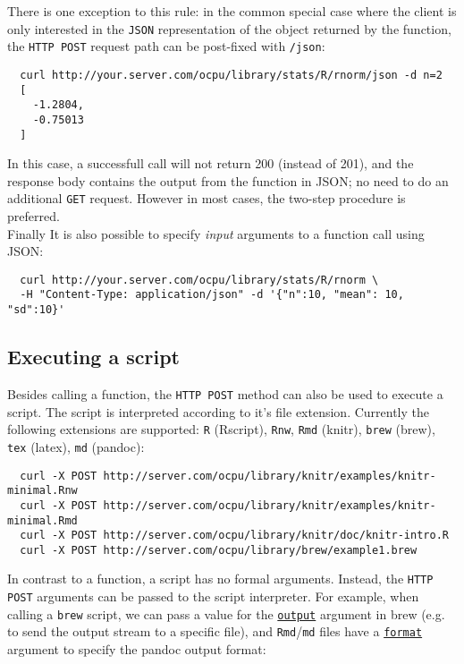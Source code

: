 \documentclass{scrartcl}\usepackage[]{graphicx}\usepackage[]{color}
\begin{document}
\noindent There is one exception to this rule: in the common special case where the client is only interested in the \texttt{JSON} representation of the object returned by the function, the \texttt{HTTP POST} request path can be post-fixed with \texttt{/json}:

\begin{verbatim}
  curl http://your.server.com/ocpu/library/stats/R/rnorm/json -d n=2
  [
    -1.2804,
  	-0.75013
  ]
\end{verbatim}
In this case, a successfull call will not return 200 (instead of 201), and the response body contains the output from the function in JSON; no need to do an additional \texttt{GET} request. However in most cases, the two-step procedure is preferred.\\

\noindent Finally It is also possible to specify \emph{input} arguments to a function call using JSON:

\begin{verbatim}
  curl http://your.server.com/ocpu/library/stats/R/rnorm \
  -H "Content-Type: application/json" -d '{"n":10, "mean": 10, "sd":10}'
\end{verbatim}


\subsection{Executing a script}

Besides calling a function, the \texttt{HTTP POST} method can also be used to execute a script. The script is interpreted according to it's file extension. Currently the following extensions are supported: \texttt{R} (Rscript), \texttt{Rnw}, \texttt{Rmd} (knitr), \texttt{brew} (brew), \texttt{tex} (latex), \texttt{md} (pandoc):

\begin{verbatim}
  curl -X POST http://server.com/ocpu/library/knitr/examples/knitr-minimal.Rnw
  curl -X POST http://server.com/ocpu/library/knitr/examples/knitr-minimal.Rmd
  curl -X POST http://server.com/ocpu/library/knitr/doc/knitr-intro.R
  curl -X POST http://server.com/ocpu/library/brew/example1.brew
\end{verbatim}

\noindent In contrast to a function, a script has no formal arguments. Instead, the \texttt{HTTP POST} arguments can be passed to the script interpreter. For example, when calling a \texttt{brew} script, we can pass a value for the \href{https://www.rforge.net/doc/packages/brew/brew.html}{\texttt{output}} argument in brew (e.g. to send the output stream to a specific file), and \texttt{Rmd}/\texttt{md} files have a \href{https://www.rforge.net/doc/packages/knitr/pandoc.html}{\texttt{format}} argument to specify the pandoc output format:
\end{document}
